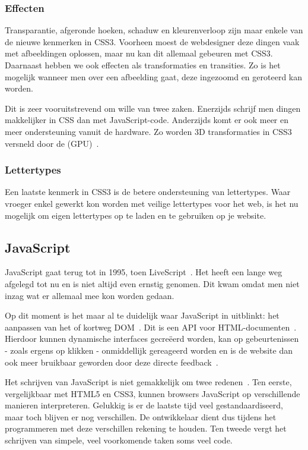 \subsubsection{Effecten}
Transparantie, afgeronde hoeken, schaduw en kleurenverloop zijn maar enkele van de nieuwe kenmerken in CSS3. Voorheen moest de webdesigner deze dingen vaak met afbeeldingen oplossen, maar nu kan dit allemaal gebeuren met CSS3. Daarnaast hebben we ook effecten als transformaties en transities. Zo is het mogelijk wanneer men over een afbeelding gaat, deze ingezoomd en geroteerd kan worden. 

Dit is zeer vooruitstrevend om wille van twee zaken. Enerzijds schrijf men dingen makkelijker in CSS dan met JavaScript-code. Anderzijds komt er ook meer en meer ondersteuning vanuit de hardware. Zo worden 3D transformaties in CSS3 versneld door de  (GPU)~\cite{Hales2012,Kool2012}.

\subsubsection{Lettertypes}
Een laatste kenmerk in CSS3 is de betere ondersteuning van lettertypes. Waar vroeger enkel gewerkt kon worden met veilige lettertypes voor het web, is het nu mogelijk om eigen lettertypes op te laden en te gebruiken op je website.

\subsection{JavaScript}
\label{ref:javascript}
JavaScript gaat terug tot in 1995, toen LiveScript~\cite{McFarland2011}. Het heeft een lange weg afgelegd tot nu en is niet altijd even ernstig genomen. Dit kwam omdat men niet inzag wat er allemaal mee kon worden gedaan. 

Op dit moment is het maar al te duidelijk waar JavaScript in uitblinkt: het aanpassen van het  of kortweg DOM~\cite{PhilDutson2012}. Dit is een API voor HTML-documenten~\cite{Hegaret2004}. Hierdoor kunnen dynamische interfaces gecreëerd worden, kan op gebeurtenissen - zoals ergens op klikken - onmiddellijk gereageerd worden en is de website dan ook meer bruikbaar geworden door deze directe feedback~\cite{McFarland2011}.

Het schrijven van JavaScript is niet gemakkelijk om twee redenen~\cite{McFarland2011}. Ten eerste, vergelijkbaar met HTML5 en CSS3, kunnen browsers JavaScript op verschillende manieren interpreteren. Gelukkig is er de laatste tijd veel gestandaardiseerd, maar toch blijven er nog verschillen. %
De ontwikkelaar dient dus tijdens het programmeren met deze verschillen rekening te houden. Ten tweede vergt het schrijven van simpele, veel voorkomende taken soms veel code.

